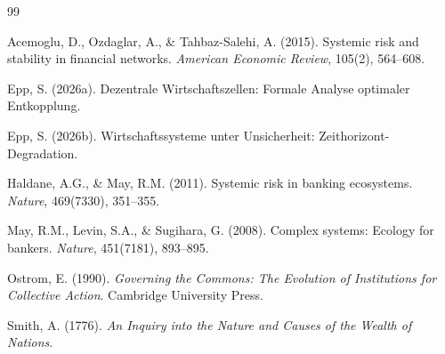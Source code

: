 \documentclass[a4paper,11pt]{report}
\theoremstyle{definition}
\begin{document}

\begin{thebibliography}{99}

Acemoglu, D., Ozdaglar, A., \& Tahbaz-Salehi, A. (2015).
\newblock Systemic risk and stability in financial networks.
\newblock \emph{American Economic Review}, 105(2), 564--608.

Epp, S. (2026a).
\newblock Dezentrale Wirtschaftszellen: Formale Analyse optimaler Entkopplung.

Epp, S. (2026b).
\newblock Wirtschaftssysteme unter Unsicherheit: Zeithorizont-Degradation.

Haldane, A.G., \& May, R.M. (2011).
\newblock Systemic risk in banking ecosystems.
\newblock \emph{Nature}, 469(7330), 351--355.

May, R.M., Levin, S.A., \& Sugihara, G. (2008).
\newblock Complex systems: Ecology for bankers.
\newblock \emph{Nature}, 451(7181), 893--895.

Ostrom, E. (1990).
\newblock \emph{Governing the Commons: The Evolution of Institutions for Collective Action}.
\newblock Cambridge University Press.

Smith, A. (1776).
\newblock \emph{An Inquiry into the Nature and Causes of the Wealth of Nations}.

\end{thebibliography}
\end{document}
